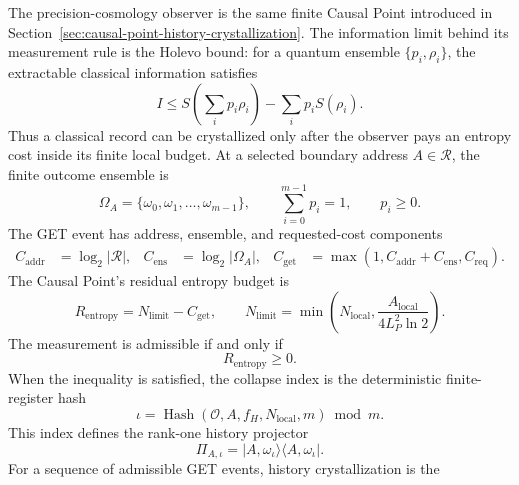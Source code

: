 \documentclass[11pt,letterpaper]{article}
\theoremstyle{plain}
\newcommand{\Lp}{L_P}
\begin{document}
The precision-cosmology observer is the same finite Causal Point introduced in
Section~\ref{sec:causal-point-history-crystallization}.  The information
limit behind its measurement rule is the Holevo bound: for a quantum ensemble
\(\{p_i,\rho_i\}\), the extractable classical information satisfies
\begin{equation}
\label{eq:precision-holevo-bound}
 I
 \le
 S\!\left(\sum_i p_i\rho_i\right)
 -
 \sum_i p_iS(\rho_i).
\end{equation}
Thus a classical record can be crystallized only after the observer pays an
entropy cost inside its finite local budget.  At a selected boundary address
\(A\in\mathcal R\), the finite outcome ensemble is
\begin{equation}
\label{eq:precision-get-outcome-ensemble}
 \Omega_A
 =
 \{\omega_0,\omega_1,\ldots,\omega_{m-1}\},
 \qquad
 \sum_{i=0}^{m-1}p_i=1,
 \qquad
 p_i\ge0.
\end{equation}
The GET event has address, ensemble, and requested-cost components
\begin{align}
\label{eq:precision-get-costs}
 C_{\text{addr}}
 &=
 \log_2|\mathcal R|,
 &
 C_{\text{ens}}
 &=
 \log_2|\Omega_A|,
 &
 C_{\text{get}}
 &=
 \max\!\left(1,C_{\text{addr}}+C_{\text{ens}},C_{\text{req}}\right).
\end{align}
The Causal Point's residual entropy budget is
\begin{equation}
\label{eq:precision-get-budget-residual}
 R_{\text{entropy}}
 =
 N_{\text{limit}}-C_{\text{get}},
 \qquad
 N_{\text{limit}}
 =
 \min\!\left(
 N_{\text{local}},
 \frac{A_{\text{local}}}{4\Lp^2\ln2}
 \right).
\end{equation}
The measurement is admissible if and only if
\begin{equation}
\label{eq:precision-get-admissibility}
 R_{\text{entropy}}\ge0.
\end{equation}
When the inequality is satisfied, the collapse index is the deterministic
finite-register hash
\begin{equation}
\label{eq:precision-collapse-index}
 \iota
 =
 \operatorname{Hash}\!\left(
 \mathcal O,
 A,
 f_H,
 N_{\text{local}},
 m
 \right)
 \bmod m.
\end{equation}
This index defines the rank-one history projector
\begin{equation}
\label{eq:precision-history-projector}
 \boxed{
 \Pi_{A,\iota}
 =
 |A,\omega_{\iota}\rangle\langle A,\omega_{\iota}|.
 }
\end{equation}
For a sequence of admissible GET events, history crystallization is the
\end{document}
